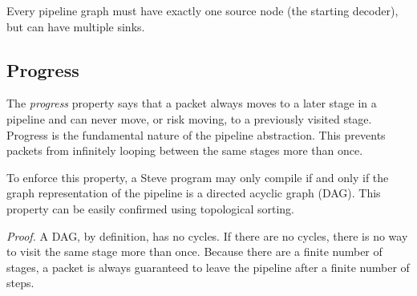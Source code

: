 Every pipeline graph must have exactly one source node (the starting decoder), but can have multiple sinks.

\subsection{Progress} \label{guide:progress}

The \textit{progress} property says that a packet always moves to a later stage in a pipeline and can never move, or risk moving, to a previously visited stage. Progress is the fundamental nature of the pipeline abstraction. This prevents packets from infinitely looping between the same stages more than once.

To enforce this property, a Steve program may only compile if and only if the graph representation of the pipeline is a directed acyclic graph (DAG). This property can be easily confirmed using topological sorting.

\textit{Proof.} A DAG, by definition, has no cycles. If there are no cycles, there is no way to visit the same stage more than once. Because there are a finite number of stages, a packet is always guaranteed to leave the pipeline after a finite number of steps.

%
%

